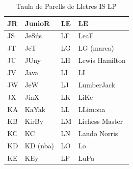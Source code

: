 \begin{table}[ht]
\begin{tabular}{|l|l|l|l|}
        JR & JunioR                 & LE & LE             \\ \hline
        JS & JeSús                  & LF & LeaF           \\ \hline
        JT & JeT                    & LG & LG (marca)     \\ \hline
        JU & JUny                   & LH & Lewis Hamilton \\ \hline
        JV & Java                   & LI & LI             \\ \hline
        JW & JeW                    & LJ & LumberJack     \\ \hline
        JX & JinX                   & LK & LiKe           \\ \hline
        KA & KaYak                  & LL & LLimona        \\ \hline
        KB & KirBy                  & LM & Lichess Master \\ \hline
        KC & KC                     & LN & Lando Norris   \\ \hline
        KD & KD (nba)               & LO & Lo             \\ \hline
        KE & KEy                    & LP & LuPa           \\ \hline
    \end{tabular}
    \caption{Taula de Parells de Lletres IS \rightarrow LP}
    \label{tla:lletres-4}
\end{table}

